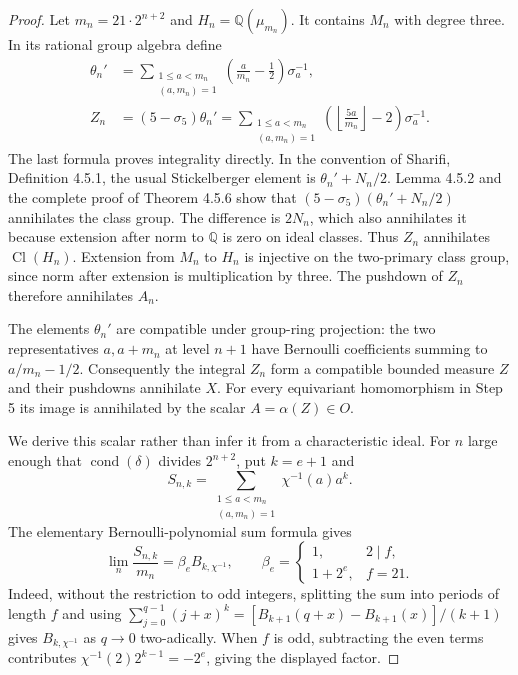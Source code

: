\begin{proof}
Let $m_n=21\cdot2^{n+2}$ and $H_n=\mathbb Q(\mu_{m_n})$.
It contains $M_n$ with degree three.
In its rational group algebra define
\[
 \begin{aligned}
 \theta_n'&=\sum_{\substack{1\leq a<m_n\\(a,m_n)=1}}
           \left(\frac a{m_n}-\frac12\right)\sigma_a^{-1},\\
 Z_n&=(5-\sigma_5)\theta_n'
   =\sum_{\substack{1\leq a<m_n\\(a,m_n)=1}}
            \left(\left\lfloor\frac{5a}{m_n}\right\rfloor-2\right)
                       \sigma_a^{-1}.
 \end{aligned}\tag{G189.14}
\]
The last formula proves integrality directly.
In the convention of Sharifi, Definition 4.5.1, the usual
Stickelberger element is $\theta_n'+N_n/2$.
Lemma 4.5.2 and the complete proof of Theorem 4.5.6 show that
$(5-\sigma_5)(\theta_n'+N_n/2)$ annihilates the class group.
The difference is $2N_n$, which also annihilates it because
extension after norm to $\mathbb Q$ is zero on ideal classes.
Thus $Z_n$ annihilates $\operatorname{Cl}(H_n)$.
Extension from $M_n$ to $H_n$ is injective on the two-primary
class group, since norm after extension is multiplication by
three.  The pushdown of $Z_n$ therefore annihilates $A_n$.

The elements $\theta_n'$ are compatible under group-ring
projection: the two representatives $a,a+m_n$ at level $n+1$
have Bernoulli coefficients summing to $a/m_n-1/2$.
Consequently the integral $Z_n$ form a compatible bounded
measure $Z$ and their pushdowns annihilate $X$.
For every equivariant homomorphism in Step 5 its image is
annihilated by the scalar $A=\alpha(Z)\in O$.

We derive this scalar rather than infer it from a characteristic
ideal.  For $n$ large enough that $\operatorname{cond}(\delta)$
divides $2^{n+2}$, put $k=e+1$ and
\[
 S_{n,k}=\sum_{\substack{1\leq a<m_n\\(a,m_n)=1}}
                            \chi^{-1}(a)a^k.
\]
The elementary Bernoulli-polynomial sum formula gives
\[
 \lim_n\frac{S_{n,k}}{m_n}
      =\beta_e B_{k,\chi^{-1}},\qquad
 \beta_e=\begin{cases}1,&2\mid f,\\1+2^e,&f=21.\end{cases}
 \tag{G189.15}
\]
Indeed, without the restriction to odd integers, splitting the
sum into periods of length $f$ and using
$\sum_{j=0}^{q-1}(j+x)^k=
 [B_{k+1}(q+x)-B_{k+1}(x)]/(k+1)$ gives
$B_{k,\chi^{-1}}$ as $q\to0$ two-adically.
When $f$ is odd, subtracting the even terms contributes
$\chi^{-1}(2)2^{k-1}=-2^e$, giving the displayed factor.


\end{proof}
